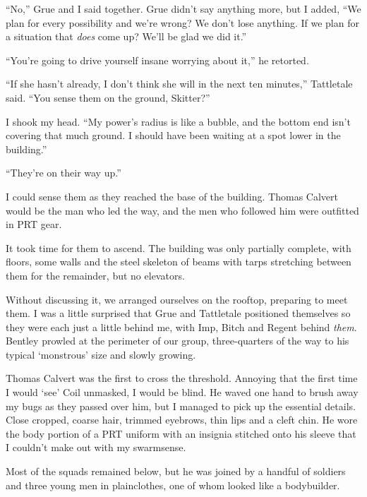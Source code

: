 ``No,'' Grue and I said together.  Grue didn't say anything more, but I added, ``We plan for every possibility and we're wrong?  We don't lose anything.  If we plan for a situation that \emph{does} come up?  We'll be glad we did it.''



``You're going to drive yourself insane worrying about it,'' he retorted.



``If she hasn't already, I don't think she will in the next ten minutes,'' Tattletale said.  ``You sense them on the ground, Skitter?''



I shook my head.  ``My power's radius is like a bubble, and the bottom end isn't covering that much ground.  I should have been waiting at a spot lower in the building.''



``They're on their way up.''



I could sense them as they reached the base of the building.  Thomas Calvert would be the man who led the way, and the men who followed him were outfitted in PRT gear.



It took time for them to ascend.  The building was only partially complete, with floors, some walls and the steel skeleton of beams with tarps stretching between them for the remainder, but no elevators.



Without discussing it, we arranged ourselves on the rooftop, preparing to meet them.  I was a little surprised that Grue and Tattletale positioned themselves so they were each just a little behind me, with Imp, Bitch and Regent behind \emph{them}.  Bentley prowled at the perimeter of our group, three-quarters of the way to his typical `monstrous' size and slowly growing.



Thomas Calvert was the first to cross the threshold.  Annoying that the first time I would `see' Coil unmasked, I would be blind.  He waved one hand to brush away my bugs as they passed over him, but I managed to pick up the essential details.  Close cropped, coarse hair, trimmed eyebrows, thin lips and a cleft chin.  He wore the body portion of a PRT uniform with an insignia stitched onto his sleeve that I couldn't make out with my swarmsense.



Most of the squads remained below, but he was joined by a handful of soldiers and three young men in plainclothes, one of whom looked like a bodybuilder.



